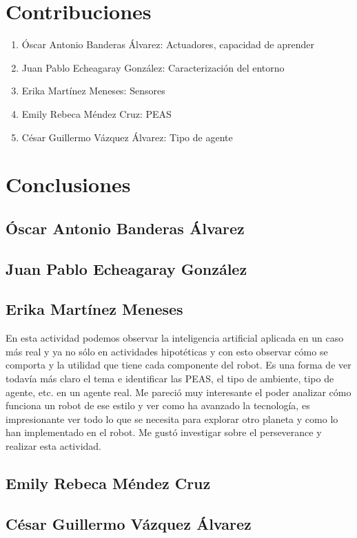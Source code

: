 \documentclass{article}
\begin{document}
    \section{Contribuciones}
        \begin{enumerate}
            \item Óscar Antonio Banderas Álvarez: Actuadores, capacidad de aprender
            \item Juan Pablo Echeagaray González: Caracterización del entorno
            \item Erika Martínez Meneses: Sensores
            \item Emily Rebeca Méndez Cruz: PEAS
            \item César Guillermo Vázquez Álvarez: Tipo de agente
        \end{enumerate}

    \section{Conclusiones}
        \subsection{Óscar Antonio Banderas Álvarez}

        \subsection{Juan Pablo Echeagaray González}

        \subsection{Erika Martínez Meneses}
            En esta actividad podemos observar la inteligencia artificial aplicada en un caso más real y ya no sólo en actividades hipotéticas y con esto observar cómo se comporta y la utilidad que tiene cada componente del robot. Es una forma de ver todavía más claro el tema e identificar las PEAS, el tipo de ambiente, tipo de agente, etc. en un agente real. Me pareció muy interesante el poder analizar cómo funciona un robot de ese estilo y ver como ha avanzado la tecnología, es impresionante ver todo lo que se necesita para explorar otro planeta y como lo han implementado en el robot. Me gustó investigar sobre el perseverance y realizar esta actividad.
            
        \subsection{Emily Rebeca Méndez Cruz}

        \subsection{César Guillermo Vázquez Álvarez}
        
    \nocite{*}
    \printbibliography
\end{document}
